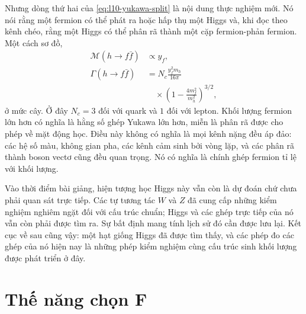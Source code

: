Nhưng dòng thứ hai của \eqref{eq:l10-yukawa-split} là nội dung thực nghiệm mới. Nó nói rằng một fermion có thể phát ra hoặc hấp thụ một Higgs và, khi đọc theo kênh chéo, rằng một Higgs có thể phân rã thành một cặp fermion-phản fermion. Một cách sơ đồ,
\begin{equation}
\begin{aligned}
  \mathcal M(h\to f\bar f)&\propto y_f,
  \\
  \Gamma(h\to f\bar f)
  &=
  N_c\frac{y_f^2m_h}{16\pi}
  \\
  &\quad\times
  \left(1-\frac{4m_f^2}{m_h^2}\right)^{3/2},
\end{aligned}
  \label{eq:l10-higgs-fermion-width}
\end{equation}
ở mức cây. Ở đây \(N_c=3\) đối với quark và \(1\) đối với lepton. Khối lượng fermion lớn hơn có nghĩa là hằng số ghép Yukawa lớn hơn, miễn là phân rã được cho phép về mặt động học. Điều này không có nghĩa là mọi kênh nặng đều áp đảo: các hệ số màu, không gian pha, các kênh cảm sinh bởi vòng lặp, và các phân rã thành boson vectơ cũng đều quan trọng. Nó có nghĩa là chính ghép fermion tỉ lệ với khối lượng.

\begin{classroomqa}
\end{classroomqa}

Vào thời điểm bài giảng, hiện tượng học Higgs này vẫn còn là dự đoán chứ chưa phải quan sát trực tiếp. Các tự tương tác \(W\) và \(Z\) đã cung cấp những kiểm nghiệm nghiêm ngặt đối với cấu trúc chuẩn; Higgs và các ghép trực tiếp của nó vẫn còn phải được tìm ra. Sự bất định mang tính lịch sử đó cần được lưu lại. Kết cục về sau cũng vậy: một hạt giống Higgs đã được tìm thấy, và các phép đo các ghép của nó hiện nay là những phép kiểm nghiệm cùng cấu trúc sinh khối lượng được phát triển ở đây.

\section{Thế năng chọn F}

